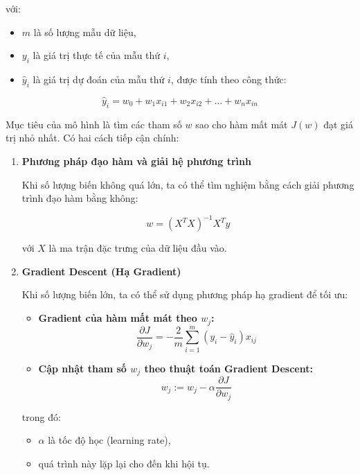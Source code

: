 với:
\begin{itemize}
    \item \( m \) là số lượng mẫu dữ liệu,
    \item \( y_i \) là giá trị thực tế của mẫu thứ \( i \),
    \item \( \hat{y}_i \) là giá trị dự đoán của mẫu thứ \( i \), được tính theo công thức:
\end{itemize}

\begin{equation}
\hat{y}_i = w_0 + w_1x_{i1} + w_2x_{i2} + \dots + w_nx_{in}
\end{equation}

Mục tiêu của mô hình là tìm các tham số \( w \) sao cho hàm mất mát \( J(w) \) đạt giá trị nhỏ nhất. Có hai cách tiếp cận chính:

\begin{enumerate}
    \item \textbf{Phương pháp đạo hàm và giải hệ phương trình}  

    Khi số lượng biến không quá lớn, ta có thể tìm nghiệm bằng cách giải phương trình đạo hàm bằng không:

    \begin{equation}
    w = (X^TX)^{-1}X^Ty
    \end{equation}

    với \( X \) là ma trận đặc trưng của dữ liệu đầu vào.

    \item \textbf{Gradient Descent (Hạ Gradient)}

    Khi số lượng biến lớn, ta có thể sử dụng phương pháp hạ gradient để tối ưu:

    \begin{itemize}
        \item \textbf{Gradient của hàm mất mát theo \( w_j \):}
        \begin{equation}
        \frac{\partial J}{\partial w_j} = -\frac{2}{m} \sum_{i=1}^{m} (y_i - \hat{y}_i) x_{ij}
        \end{equation}
        
        \item \textbf{Cập nhật tham số \( w_j \) theo thuật toán Gradient Descent:}
        \begin{equation}
        w_j := w_j - \alpha \frac{\partial J}{\partial w_j}
        \end{equation}
    \end{itemize}

    trong đó:
    \begin{itemize}
        \item \( \alpha \) là tốc độ học (learning rate),
        \item quá trình này lặp lại cho đến khi hội tụ.
    \end{itemize}

\end{enumerate}
